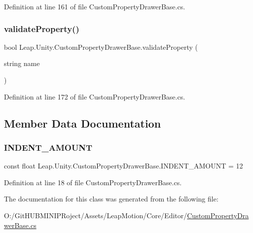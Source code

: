 Definition at line 161 of file Custom\+Property\+Drawer\+Base.\+cs.

\mbox{\label{class_leap_1_1_unity_1_1_custom_property_drawer_base_a7b61387c6f2b8fd23cf9260000a1152f}} 
\subsubsection{\texorpdfstring{validateProperty()}{validateProperty()}}
{\footnotesize\ttfamily bool Leap.\+Unity.\+Custom\+Property\+Drawer\+Base.\+validate\+Property (\begin{DoxyParamCaption}\item[{string}]{name }\end{DoxyParamCaption})\hspace{0.3cm}{\ttfamily [protected]}}



Definition at line 172 of file Custom\+Property\+Drawer\+Base.\+cs.



\subsection{Member Data Documentation}
\mbox{\label{class_leap_1_1_unity_1_1_custom_property_drawer_base_a9a3423b6bcde5af34f26eb046f47e094}} 
\subsubsection{\texorpdfstring{INDENT\_AMOUNT}{INDENT\_AMOUNT}}
{\footnotesize\ttfamily const float Leap.\+Unity.\+Custom\+Property\+Drawer\+Base.\+I\+N\+D\+E\+N\+T\+\_\+\+A\+M\+O\+U\+NT = 12}



Definition at line 18 of file Custom\+Property\+Drawer\+Base.\+cs.



The documentation for this class was generated from the following file\+:\begin{DoxyCompactItemize}
\item 
O\+:/\+Git\+H\+U\+B\+M\+I\+N\+I\+P\+Roject/\+Assets/\+Leap\+Motion/\+Core/\+Editor/\mbox{\hyperlink{_custom_property_drawer_base_8cs}{Custom\+Property\+Drawer\+Base.\+cs}}\end{DoxyCompactItemize}
